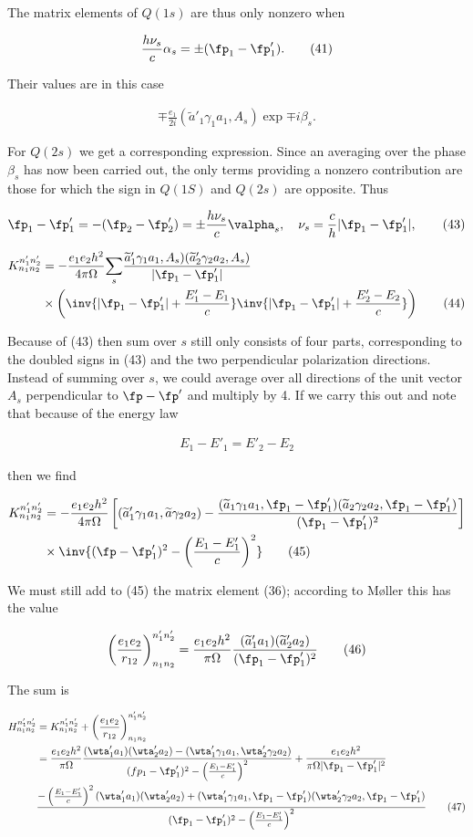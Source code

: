 \documentclass{article}
\newcommand{\nequ}[2]{
\begin{align*}
#1
\tag{#2}
\end{align*}
}
\newcommand{\uequ}[1]{
\begin{align*}
#1
\end{align*}
}
\newcommand{\sumX}[1]{\underset{#1}{\sum}}
\begin{document}
The matrix elements of $Q(1s)$ are thus only nonzero when
\nequ{
\frac{h\nu_s}{c}\alpha_s = \pm(\fp_1 - \fp'_1).
}{41}
Their values are in this case
\nequ{
\mp \frac{e_1}{2i}(\widetilde{a}'_1 \gamma_1 a_1, A_s)\exp{\mp i \beta_s}.
}{42}
For $Q(2s)$ we get a corresponding expression. Since an averaging over the phase $\beta_s$ has now been carried out, the only terms providing a nonzero contribution are those for which the sign in $Q(1S)$ and $Q(2s)$ are opposite. Thus
\nequ{
\fp_1 - \fp'_1 = -(\fp_2 - \fp'_2) = \pm\frac{h\nu_s}{c}\valpha_s,\quad
\nu_s = \frac{c}{h}|\fp_1 - \fp'_1|,
}{43}
\nequ{
K_{n_1 n_2}^{n'_1 n'_2} &= -\frac{e_1 e_2 h^2}{4\pi \Omega}
\sumX{s}\frac{\widetilde{a}'_1 \gamma_1 a_1, A_s)(\widetilde{a}'_2 \gamma_2 a_2, A_s)}{|\fp_1-\fp'_1|}\\
&\times \left(\inv{|\fp_1 - \fp'_1| + \frac{E'_1 - E_1}{c}}
\inv{|\fp_1 - \fp'_1| + \frac{E'_2 - E_2}{c}}
\right)
}{44}
Because of (43) then sum over $s$ still only consists of four parts, corresponding to the doubled signs in (43) and the two perpendicular polarization directions. Instead of summing over $s$, we could average over all directions of the unit vector $A_s$ perpendicular to $\fp-\fp'$ and multiply by 4. If we carry this out and note that because of the energy law
\uequ{
E_1 - E'_1 = E'_2 - E_2
}
then we find
\nequ{
K_{n_1 n_2}^{n'_1 n'_2} &= -\frac{e_1 e_2 h^2}{4\pi \Omega}\left[
(\widetilde{a}'_1 \gamma_1 a_1, \widetilde{a}\gamma_2 a_2) - 
\frac{(\widetilde{a}_1\gamma_1 a_1, \fp_1 - \fp'_1)
(\widetilde{a}_2\gamma_2 a_2, \fp_1 - \fp'_1)
}{(\fp_1 - \fp'_1)^2}
\right]\\
&\times \inv{(\fp-\fp'_1)^2-\left(\frac{E_1 - E'_1}{c}\right)^2}
}{45}
We must still add to (45) the matrix element (36); according to Møller this has the value
\nequ{
\left(\frac{e_1 e_2}{r_{12}}\right)_{n_1 n_2}^{n'_1 n'_2} = \frac{e_1 e_2 h^2}{\pi\Omega}
\frac{(\widetilde{a}'_1 a_1)(\widetilde{a}'_2 a_2)}{(\fp_1 - \fp'_1)^2}
}{46}
The sum is
\nequ{
H_{n_1 n_2}^{n'_1 n'_2} &= K_{n_1 n_2}^{n'_1 n'_2} 
+ \left(\frac{e_1 e_2}{r_{12}}\right)_{n_1 n_2}^{n'_1 n'_2}\\
 &= \frac{e_1 e_2 h^2}{\pi\Omega}
 \frac{(\wta'_1 a_1)(\wta'_2 a_2) - (\wta'_1 \gamma_1 a_1, \wta'_2 \gamma_2 a_2)}
 {(fp_1 - \fp'_1)^2 - \left(\frac{E_1 - E'_1}{c}\right)^2} 
 + \frac{e_1 e_2 h^2}{\pi\Omega|\fp_1 - \fp'_1|^2}\\
& \frac{-\left(\frac{E_1 - E'_1}{c}\right)^2(\wta'_1 a_1)(\wta'_2 a_2)
 + (\wta'_1\gamma_1 a_1, \fp_1 - \fp'_1)(\wta'_2 \gamma_2 a_2, \fp_1 - \fp'_1)
 }{(\fp_1 - \fp'_1)^2 - \left(\frac{E_1 - E'_1}{c}\right)^2}
}{47}
\end{document}
